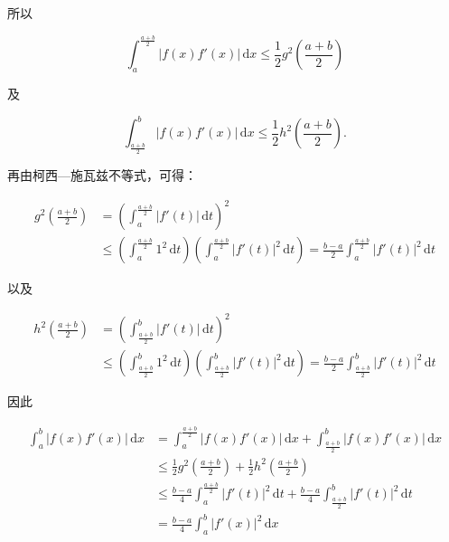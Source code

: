 所以

\[ \int_{a}^{\frac{a+b}{2}}|f(x)f'(x)|\,\mathrm{d}x \leq \frac{1}{2}g^{2}\left(\frac{a+b}{2}\right) \]

及

\[ \int_{\frac{a+b}{2}}^{b}|f(x)f'(x)|\,\mathrm{d}x \leq \frac{1}{2}h^{2}\left(\frac{a+b}{2}\right). \]



再由柯西—施瓦兹不等式，可得：

\[ 

\begin{aligned} 

g^{2}\left(\frac{a+b}{2}\right) &= \left(\int_{a}^{\frac{a+b}{2}}|f'(t)|\,\mathrm{d}t\right)^{2} \\ 

&\leq \left(\int_{a}^{\frac{a+b}{2}}1^{2}\,\mathrm{d}t\right)\left(\int_{a}^{\frac{a+b}{2}}|f'(t)|^{2}\,\mathrm{d}t\right) = \frac{b-a}{2}\int_{a}^{\frac{a+b}{2}}|f'(t)|^{2}\,\mathrm{d}t 

\end{aligned} 

\]

以及

\[ 

\begin{aligned} 

h^{2}\left(\frac{a+b}{2}\right) &= \left(\int_{\frac{a+b}{2}}^{b}|f'(t)|\,\mathrm{d}t\right)^{2} \\ 

&\leq \left(\int_{\frac{a+b}{2}}^{b}1^{2}\,\mathrm{d}t\right)\left(\int_{\frac{a+b}{2}}^{b}|f'(t)|^{2}\,\mathrm{d}t\right) = \frac{b-a}{2}\int_{\frac{a+b}{2}}^{b}|f'(t)|^{2}\,\mathrm{d}t 

\end{aligned} 

\]



因此

\[ 

\begin{aligned} 

\int_{a}^{b}|f(x)f'(x)|\,\mathrm{d}x &= \int_{a}^{\frac{a+b}{2}}|f(x)f'(x)|\,\mathrm{d}x + \int_{\frac{a+b}{2}}^{b}|f(x)f'(x)|\,\mathrm{d}x \\ 

&\leq \frac{1}{2}g^{2}\left(\frac{a+b}{2}\right) + \frac{1}{2}h^{2}\left(\frac{a+b}{2}\right) \\ 

&\leq \frac{b-a}{4}\int_{a}^{\frac{a+b}{2}}|f'(t)|^{2}\,\mathrm{d}t + \frac{b-a}{4}\int_{\frac{a+b}{2}}^{b}|f'(t)|^{2}\,\mathrm{d}t \\ 

&= \frac{b-a}{4}\int_{a}^{b}|f'(x)|^{2}\,\mathrm{d}x 

\end{aligned} 

\]




